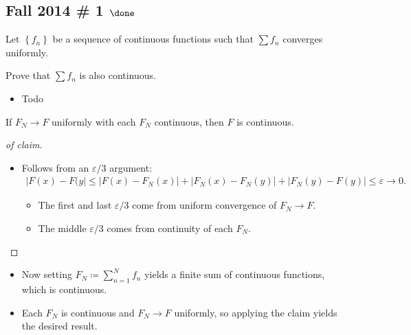 \hypertarget{fall-2014-1-done}{%
\subsection{\texorpdfstring{Fall 2014 \# 1
\(\done\)}{Fall 2014 \# 1 \textbackslash done}}\label{fall-2014-1-done}}

Let \(\left\{{f_n}\right\}\) be a sequence of continuous functions such
that \(\sum f_n\) converges uniformly.

Prove that \(\sum f_n\) is also continuous.

\envlist

\begin{concept}

\envlist

\begin{itemize}
\tightlist
\item
  Todo
\end{itemize}

\end{concept}

\begin{solution}

\envlist

\begin{claim}

If \(F_N\to F\) uniformly with each \(F_N\) continuous, then \(F\) is
continuous.

\end{claim}

\begin{proof}[of claim]

\envlist

\begin{itemize}
\item
  Follows from an \(\varepsilon/3\) argument:
  \begin{align*}  
  {\left\lvert {F(x) - F(y} \right\rvert} \leq 
  {\left\lvert {F(x) - F_N(x)} \right\rvert} + {\left\lvert {F_N(x) - F_N(y)} \right\rvert} + {\left\lvert {F_N(y) - F(y)} \right\rvert} 
  \leq \varepsilon\to 0
  .\end{align*}

  \begin{itemize}
  \tightlist
  \item
    The first and last \(\varepsilon/3\) come from uniform convergence
    of \(F_N\to F\).
  \item
    The middle \(\varepsilon/3\) comes from continuity of each \(F_N\).
  \end{itemize}
\end{itemize}

\end{proof}

\begin{itemize}
\tightlist
\item
  Now setting \(F_N\coloneqq\sum_{n=1}^N f_n\) yields a finite sum of
  continuous functions, which is continuous.
\item
  Each \(F_N\) is continuous and \(F_N\to F\) uniformly, so applying the
  claim yields the desired result.
\end{itemize}

\end{solution}

